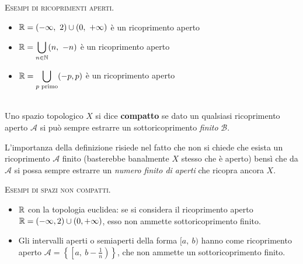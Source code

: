 \begin{examples} \textsc{Esempi di ricoprimenti aperti.}
	\begin{itemize}
		\item $\displaystyle \realset=(-\infty ,\ 2)\cup(0,\ +\infty)$ è un ricoprimento aperto
		\item $\displaystyle \mathbb{R} =\mathop{{\bigcup}}\displaylimits_{n\in\mathbb{N}}(n,\ -n)$ è un ricoprimento aperto
		\item $\displaystyle \mathbb{R}=\mathop{{\bigcup}}\displaylimits_{p \text{ primo}}(-p,p)$ è un ricoprimento aperto
	\end{itemize}
\end{examples}

\begin{define}~{}\\
	Uno spazio topologico $X$ si dice \textbf{compatto} se dato un qualsiasi ricoprimento aperto $\mathcal{A}$ si può sempre estrarre un sottoricoprimento \textit{finito} $\mathcal{B}$.
\end{define}
L'importanza della definizione risiede nel fatto che non si chiede che esista un ricoprimento $\mathcal{A}$ finito (basterebbe banalmente $X$ stesso che è aperto) bensì che da $\mathcal{A}$ si possa sempre estrarre un \textit{numero finito di aperti} che ricopra ancora $X$.

\begin{examples} \textsc{Esempi di spazi non compatti.}
	\begin{itemize}
		\item $\mathbb{R}$ con la topologia euclidea: se si considera il ricoprimento aperto $\displaystyle \mathbb{R}=(-\infty , 2)\cup(0,+\infty)$, esso non ammette sottoricoprimento finito.
		\item Gli intervalli aperti o semiaperti della forma $[a,\ b)$ hanno come ricoprimento aperto $\mathcal{A}=\left\{ \left[ a, \ b-\frac{1}{n}\right) \right\}$, che non ammette un sottoricoprimento finito.
	\end{itemize}
\end{examples}

